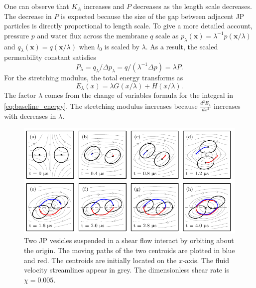 \documentclass[lineno]{jfm}
\begin{document}
One can observe that $K_A$ increases and $P$ decreases as the length scale decreases. 
The decrease in  $P$ is expected because 
the size of the gap between adjacent JP particles is directly proportional to length scale.
To give a more detailed account, pressure $p$ and water flux across the membrane $q$ scale as 
$p_{\lambda}(\mathbf{x}) = \lambda^{-1} p(\mathbf{x}/\lambda)$ and 
$q_{\lambda}(\mathbf{x}) = q(\mathbf{x}/\lambda)$ 
when $l_0$ is scaled by $\lambda$. As a result, the scaled permeability constant satisfies 
\[
P_{\lambda} = q_{\lambda}/\Delta p_{\lambda} = q/(\lambda^{-1} \Delta p) = \lambda P.
\]
For the stretching modulus, the total energy transforms as 
\[E_{\lambda}(x) = \lambda G(x/\lambda) + H(x/\lambda ).\]
The factor $\lambda$ comes from the change of 
variables formula for the integral in \eqref{eq:baseline_energy}.
The stretching modulus increases because $\frac{d^2E_{\lambda}}{dx^2}$ increases with decreases in $\lambda.$ 

\begin{figure}
  \begin{center}
\includegraphics[width=\textwidth]{Figure9_Wrapper.pdf}
\end{center} 
  \caption{\label{figure9} Two JP vesicles suspended in a shear flow
  interact by orbiting about the origin. The moving paths of the two
  centroids are plotted in blue and red. The centroids are initially
  located on the $x$-axis. The fluid velocity streamlines appear in
  grey.  The dimensionless shear rate is $\chi=0.005$.}
\end{figure}
\end{document}
